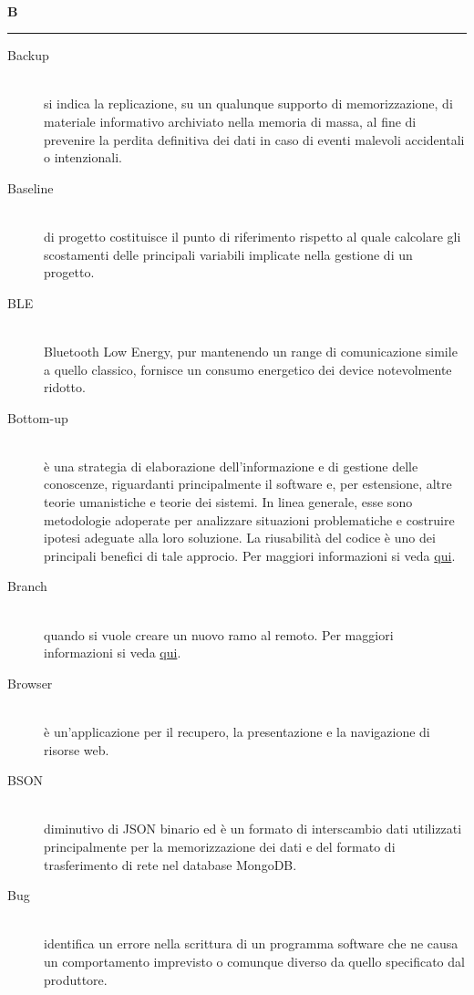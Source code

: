\documentclass[12pt,a4paper]{article}
\begin{document}
\newpage

\begin{center}
\hfill\\
	\LARGE \textbf{B}
\hfill\\
\rule[15pt]{30pt}{0.5pt}
\end{center}

\begin{description}
\item[Backup]
\hfill\\si indica la replicazione, su un qualunque supporto di memorizzazione, di materiale informativo archiviato nella memoria di massa, al fine di prevenire la perdita definitiva dei dati in caso di eventi malevoli accidentali o intenzionali.

\item[Baseline]
\hfill\\ di progetto costituisce il punto di riferimento rispetto al quale calcolare gli scostamenti delle principali variabili implicate nella gestione di un progetto.

\item[BLE]
\hfill\\ Bluetooth Low Energy,  pur mantenendo un range di comunicazione simile a quello classico, fornisce un  consumo energetico dei device notevolmente ridotto.

\item[Bottom-up]
\hfill\\è una strategia di elaborazione dell'informazione e di gestione delle conoscenze, riguardanti principalmente il software e, per estensione, altre teorie umanistiche e teorie dei sistemi. In linea generale, esse sono metodologie adoperate per analizzare situazioni problematiche e costruire ipotesi adeguate alla loro soluzione. La riusabilità del codice è uno dei principali benefici di tale approcio. Per maggiori informazioni si veda \href{https://it.wikipedia.org/wiki/Progettazione_top-down_e_bottom-up}{qui}.

\item[Branch]
\hfill\\ quando si vuole creare un nuovo ramo al  remoto. Per maggiori informazioni si veda \href{https://git-scm.com/docs/}{qui}.

\item[Browser]
\hfill\\ è un'applicazione per il recupero, la presentazione e la navigazione di risorse web.

\item[BSON]
\hfill\\ diminutivo di JSON binario ed è un formato di interscambio dati utilizzati principalmente per la memorizzazione dei dati e del formato di trasferimento di rete nel database MongoDB.

\item[Bug]
\hfill\\ identifica un errore nella scrittura di un programma software che ne causa un comportamento imprevisto o comunque diverso da quello specificato dal produttore.
\end{description}
\end{document}
